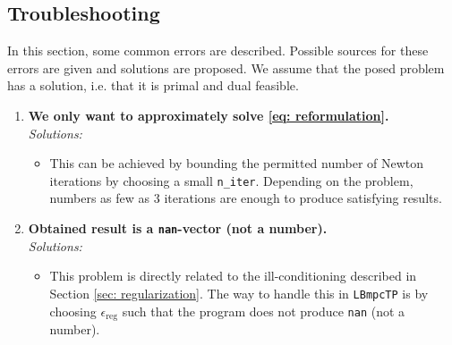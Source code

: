 \documentclass[letter]{article}
\begin{document}
\begin{sffamily}
\subsection{Troubleshooting}
In this section, some common errors are described. Possible sources for these errors are given and solutions are proposed. We assume that the posed problem has a solution, i.e. that it is primal and dual feasible.
\begin{enumerate}	
	\item \textbf{We only want to approximately solve \eqref{eq: reformulation}.} \\
		\emph{Solutions:}
			\begin{itemize}				
				\item This can be achieved by bounding the permitted number of Newton iterations by choosing a small \texttt{n\_iter}. Depending on the problem, numbers as few as $3$ iterations are enough to produce satisfying results.
			\end{itemize}
	
	\item \textbf{Obtained result is a \texttt{nan}-vector (not a number).} \\
		\emph{Solutions:}
		\begin{itemize}
			\item This problem is directly related to the ill-conditioning described in Section \ref{sec: regularization}. The way to handle this in \texttt{LBmpcTP} is by choosing $\epsilon_\text{reg}$ such that the program does not produce \texttt{nan} (not a number).
		\end{itemize}
\end{enumerate}


\end{sffamily}
\end{document}
